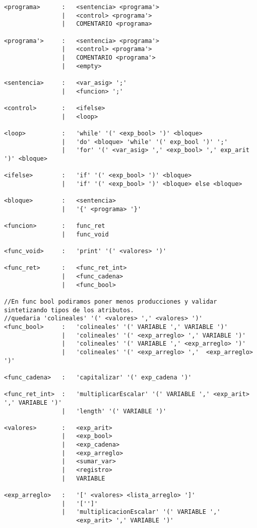 \begin{verbatim}
<programa>      :   <sentencia> <programa'>   
                |   <control> <programa'>   
                |   COMENTARIO <programa>   

<programa'>     :   <sentencia> <programa'>   
                |   <control> <programa'>   
                |   COMENTARIO <programa'>   
                |   <empty>

<sentencia>     :   <var_asig> ';'
                |   <funcion> ';'

<control>       :   <ifelse>
                |   <loop>

<loop>          :   'while' '(' <exp_bool> ')' <bloque>
                |   'do' <bloque> 'while' '(' exp_bool ')' ';' 
                |   'for' '(' <var_asig> ',' <exp_bool> ',' exp_arit ')' <bloque>

<ifelse>        :   'if' '(' <exp_bool> ')' <bloque>
                |   'if' '(' <exp_bool> ')' <bloque> else <bloque>

<bloque>        :   <sentencia>
                |   '{' <programa> '}'

<funcion>       :   func_ret
                |   func_void

<func_void>     :   'print' '(' <valores> ')'

<func_ret>      :   <func_ret_int>
                |   <func_cadena>
                |   <func_bool>

//En func bool podiramos poner menos producciones y validar sintetizando tipos de los atributos.
//quedaria 'colineales' '(' <valores> ',' <valores> ')'
<func_bool>     :   'colineales' '(' VARIABLE ',' VARIABLE ')'
                |   'colineales' '(' <exp_arreglo> ',' VARIABLE ')'
                |   'colineales' '(' VARIABLE ',' <exp_arreglo> ')'
                |   'colineales' '(' <exp_arreglo> ','  <exp_arreglo> ')'

<func_cadena>   :   'capitalizar' '(' exp_cadena ')'

<func_ret_int>  :   'multiplicarEscalar' '(' VARIABLE ',' <exp_arit> ',' VARIABLE ')'
                |   'length' '(' VARIABLE ')'

<valores>       :   <exp_arit>
                |   <exp_bool>
                |   <exp_cadena>
                |   <exp_arreglo>
                |   <sumar_var>
                |   <registro>
                |   VARIABLE

<exp_arreglo>   :   '[' <valores> <lista_arreglo> ']'
                |   '['']'
                |   'multiplicacionEscalar' '(' VARIABLE ',' 
                    <exp_arit> ',' VARIABLE ')'


\end{verbatim}
